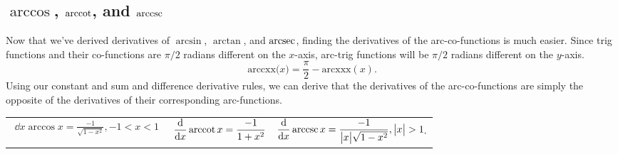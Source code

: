 \subsection{$\arccos$, $\operatorname{arccot}$, and $\operatorname{arccsc}$}
Now that we've derived derivatives of $\arcsin$, $\arctan$, and $\operatorname{arcsec}$, finding the derivatives of the arc-co-functions is much easier.
Since trig functions and their co-functions are $\pi/2$ radians different on the $x$-axis, arc-trig functions will be $\pi/2$ radians different on the $y$-axis.
\begin{equation*}
	\text{arccxx{($x$)}} = \frac{\pi}{2} - \text{arcxxx}{(x)}.
\end{equation*}
Using our constant and sum and difference derivative rules, we can derive that the derivatives of the arc-co-functions are simply the opposite of the derivatives of their corresponding arc-functions.
\begin{table}[H]
	\begin{center}
		\begin{tabular}{ l l l }
			$\begin{aligned}\dd{}{x}\arccos{x}=\frac{-1}{\sqrt{1-x^2}},-1<x<1\end{aligned}$ & $\begin{aligned}\frac{\mathrm{d} }{\mathrm{d} x}\operatorname{arccot}{x}=\frac{-1}{1+x^2}\end{aligned}$ & $\begin{aligned}\frac{\mathrm{d} }{\mathrm{d} x}\operatorname{arccsc}{x}=\frac{-1}{\big\lvert x \big\rvert\sqrt{1-x^2}},\big\lvert x \big\rvert>1\end{aligned}.$ \\
		\end{tabular}
	\end{center}
\end{table}